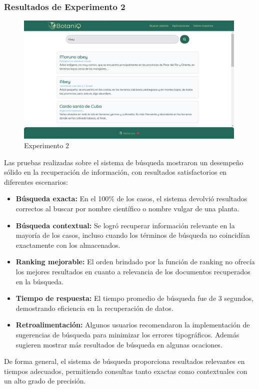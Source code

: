 \subsubsection*{Resultados de Experimento 2}
\begin{figure}[ht!]
    \centering
    \includegraphics[width=0.99\textwidth]{Images/exp2.png}
    \caption{Experimento 2}
    \label{fig:exp2}
\end{figure}
Las pruebas realizadas sobre el sistema de búsqueda mostraron un desempeño sólido en la recuperación de información, con resultados 
satisfactorios en diferentes escenarios:
\begin{itemize}
    \item \textbf{Búsqueda exacta:} En el 100\% de los casos, el sistema devolvió resultados correctos al buscar por nombre científico 
    o nombre vulgar de una planta.
    \item \textbf{Búsqueda contextual:} Se logró recuperar información relevante en la mayoría de los casos, incluso cuando los términos
    de búsqueda no coincidían exactamente con los almacenados.
    \item \textbf{Ranking mejorable:} El orden brindado por la función de ranking no ofrecía los mejores resultados en cuanto a relevancia
    de los documentos recuperados en la búsqueda.
    \item \textbf{Tiempo de respuesta:} El tiempo promedio de búsqueda fue de 3 segundos, demostrando eficiencia en la recuperación de datos.
    \item \textbf{Retroalimentación:} Algunos usuarios recomendaron la implementación de sugerencias de búsqueda para minimizar los errores 
    tipográficos. Además sugieren mostrar más resultados de búsqueda en algunas ocaciones.
\end{itemize}
De forma general, el sistema de búsqueda proporciona resultados relevantes en tiempos adecuados, permitiendo consultas tanto exactas 
como contextuales con un alto grado de precisión.

